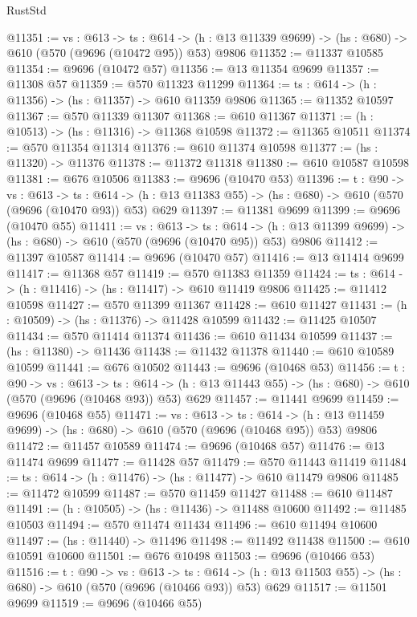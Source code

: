 \begin{lexlean}{RustStd}
\begin{coremodule}
@11351 := {vs : @613} ->
  {ts : @614} -> (h : @13 @11339 @9699) -> (hs : @680) -> @610 (@570 (@9696 (@10472 @95)) @53) @9806
@11352 := @11337 @10585
@11354 := @9696 (@10472 @57)
@11356 := @13 @11354 @9699
@11357 := @11308 @57
@11359 := @570 @11323 @11299
@11364 := {ts : @614} -> (h : @11356) -> (hs : @11357) -> @610 @11359 @9806
@11365 := @11352 @10597
@11367 := @570 @11339 @11307
@11368 := @610 @11367
@11371 := (h : @10513) -> (hs : @11316) -> @11368 @10598
@11372 := @11365 @10511
@11374 := @570 @11354 @11314
@11376 := @610 @11374 @10598
@11377 := (hs : @11320) -> @11376
@11378 := @11372 @11318
@11380 := @610 @10587 @10598
@11381 := @676 @10506
@11383 := @9696 (@10470 @53)
@11396 := {t : @90} ->
  {vs : @613} ->
  {ts : @614} -> (h : @13 @11383 @55) -> (hs : @680) -> @610 (@570 (@9696 (@10470 @93)) @53) @629
@11397 := @11381 @9699
@11399 := @9696 (@10470 @55)
@11411 := {vs : @613} ->
  {ts : @614} -> (h : @13 @11399 @9699) -> (hs : @680) -> @610 (@570 (@9696 (@10470 @95)) @53) @9806
@11412 := @11397 @10587
@11414 := @9696 (@10470 @57)
@11416 := @13 @11414 @9699
@11417 := @11368 @57
@11419 := @570 @11383 @11359
@11424 := {ts : @614} -> (h : @11416) -> (hs : @11417) -> @610 @11419 @9806
@11425 := @11412 @10598
@11427 := @570 @11399 @11367
@11428 := @610 @11427
@11431 := (h : @10509) -> (hs : @11376) -> @11428 @10599
@11432 := @11425 @10507
@11434 := @570 @11414 @11374
@11436 := @610 @11434 @10599
@11437 := (hs : @11380) -> @11436
@11438 := @11432 @11378
@11440 := @610 @10589 @10599
@11441 := @676 @10502
@11443 := @9696 (@10468 @53)
@11456 := {t : @90} ->
  {vs : @613} ->
  {ts : @614} -> (h : @13 @11443 @55) -> (hs : @680) -> @610 (@570 (@9696 (@10468 @93)) @53) @629
@11457 := @11441 @9699
@11459 := @9696 (@10468 @55)
@11471 := {vs : @613} ->
  {ts : @614} -> (h : @13 @11459 @9699) -> (hs : @680) -> @610 (@570 (@9696 (@10468 @95)) @53) @9806
@11472 := @11457 @10589
@11474 := @9696 (@10468 @57)
@11476 := @13 @11474 @9699
@11477 := @11428 @57
@11479 := @570 @11443 @11419
@11484 := {ts : @614} -> (h : @11476) -> (hs : @11477) -> @610 @11479 @9806
@11485 := @11472 @10599
@11487 := @570 @11459 @11427
@11488 := @610 @11487
@11491 := (h : @10505) -> (hs : @11436) -> @11488 @10600
@11492 := @11485 @10503
@11494 := @570 @11474 @11434
@11496 := @610 @11494 @10600
@11497 := (hs : @11440) -> @11496
@11498 := @11492 @11438
@11500 := @610 @10591 @10600
@11501 := @676 @10498
@11503 := @9696 (@10466 @53)
@11516 := {t : @90} ->
  {vs : @613} ->
  {ts : @614} -> (h : @13 @11503 @55) -> (hs : @680) -> @610 (@570 (@9696 (@10466 @93)) @53) @629
@11517 := @11501 @9699
@11519 := @9696 (@10466 @55)

\end{coremodule}
\end{lexlean}
